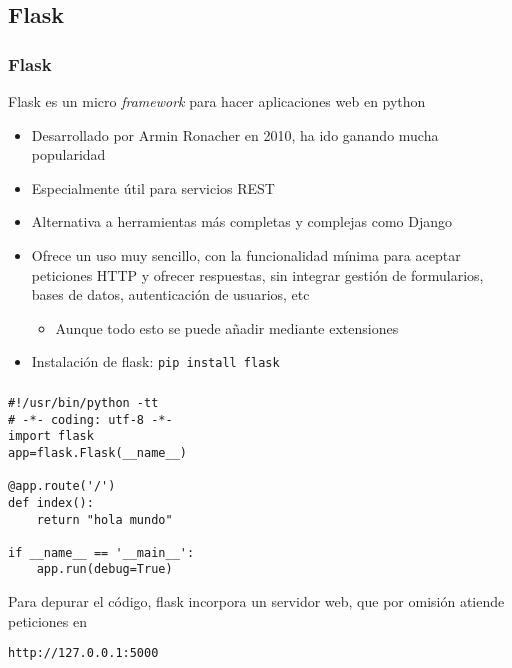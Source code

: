 \documentclass[ucs]{beamer}
\begin{document}
\subsection{Flask}
\begin{frame}[fragile]
\frametitle{Flask}
Flask es un micro \emph{framework} para hacer aplicaciones web en python
\begin{itemize}
\item
Desarrollado por Armin Ronacher en 2010, ha ido ganando mucha popularidad
\item
Especialmente útil para servicios REST
\item
Alternativa a herramientas más completas y complejas como Django
\item
Ofrece un uso muy sencillo, con la funcionalidad mínima para aceptar peticiones HTTP y ofrecer respuestas,
sin integrar  gestión de formularios, bases de datos, autenticación de usuarios, etc

\begin{itemize}
\item
Aunque todo esto se puede añadir mediante extensiones
\end{itemize}

\item
Instalación de flask:
\verb|pip install flask|

\end{itemize}

\end{frame}

\begin{frame}[fragile]
\frametitle{}


  \begin{footnotesize}
  \begin{verbatim}
#!/usr/bin/python -tt
# -*- coding: utf-8 -*-
import flask 
app=flask.Flask(__name__)

@app.route('/')
def index():
    return "hola mundo"

if __name__ == '__main__': 
    app.run(debug=True)
  \end{verbatim}
  \end{footnotesize}

Para depurar el código, flask incorpora un servidor web, que 
por omisión atiende peticiones en
  \begin{footnotesize}
  \begin{verbatim}
http://127.0.0.1:5000
  \end{verbatim}
  \end{footnotesize}

\end{frame}
\end{document}
